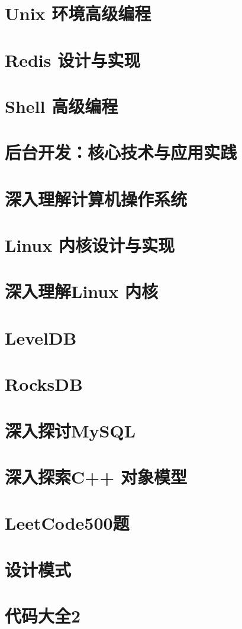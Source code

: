 \documentclass[UTF8,a4paper,12pt]{ctexbook}
\begin{document}
	\section{Unix 环境高级编程}

	\section{Redis 设计与实现}
	
	\section{Shell 高级编程}
	
	\section{后台开发：核心技术与应用实践}
	
	\section{深入理解计算机操作系统}
	
	\section{Linux 内核设计与实现}
	
	\section{深入理解Linux 内核}
	
	\section{LevelDB}
	
	\section{RocksDB}
	
	\section{深入探讨MySQL}
	
	\section{深入探索C++ 对象模型}
	
	\section{LeetCode500题}
	
	\section{设计模式}
	
	\section{代码大全2}
	
\end{document}
